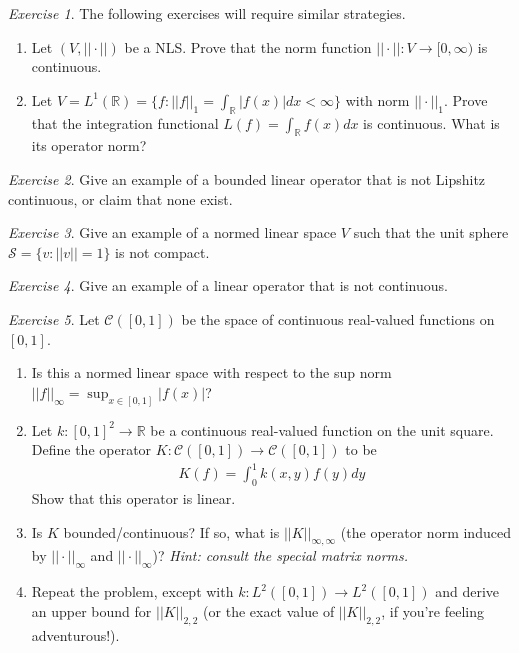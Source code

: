 \documentclass[11pt]{article}
\newcommand{\R}{\ensuremath{\mathbb R}}
\theoremstyle{plain}
\theoremstyle{definition}
\theoremstyle{remark}
\newtheorem{exc}{Exercise}[section]
\begin{document}
\begin{exc}
    The following exercises will require similar strategies.
    \begin{enumerate}
        \item Let $(V, ||\cdot||)$ be a NLS. Prove that the norm function $||\cdot||: V \rightarrow [0, \infty)$ is continuous.
        \item Let $V = L^1(\R) = \{f : ||f||_1 = \int_{\R} |f(x)| dx < \infty\}$ with norm $||\cdot||_1$. Prove that the integration functional $L(f) = \int_{\R} f(x) dx$ is continuous. What is its operator norm?
    \end{enumerate}
\end{exc}

\begin{exc}
    Give an example of a bounded linear operator that is not Lipshitz continuous, or claim that none exist.
\end{exc}

\begin{exc}
    Give an example of a normed linear space $V$ such that the unit sphere $\mathcal{S} = \{v : ||v|| = 1\}$ is not compact.
\end{exc}

\begin{exc}
    Give an example of a linear operator that is not continuous.
\end{exc}

\begin{exc}
    Let $\mathcal{C}([0,1])$ be the space of continuous real-valued functions on $[0,1]$.
    \begin{enumerate}
        \item Is this a normed linear space with respect to the sup norm $||f||_{\infty} = \sup_{x \in [0,1]} |f(x)|$?
        \item Let $k: [0,1]^2 \rightarrow \R$ be a continuous real-valued function on the unit square. Define the operator $K: \mathcal{C}([0,1]) \rightarrow \mathcal{C}([0,1])$ to be
        \begin{align*}
            K(f) = \int_{0}^1 k(x, y) f(y) dy
        \end{align*}
        Show that this operator is linear.
        \item Is $K$ bounded/continuous? If so, what is $||K||_{\infty, \infty}$ (the operator norm induced by $||\cdot||_{\infty}$ and $||\cdot||_{\infty}$)? {\it Hint: consult the special matrix norms.}
        \item Repeat the problem, except with $k: L^2([0,1]) \rightarrow L^2([0,1])$ and derive an upper bound for $||K||_{2,2}$ (or the exact value of $||K||_{2,2}$, if you're feeling adventurous!).
    \end{enumerate}
\end{exc}
\end{document}
